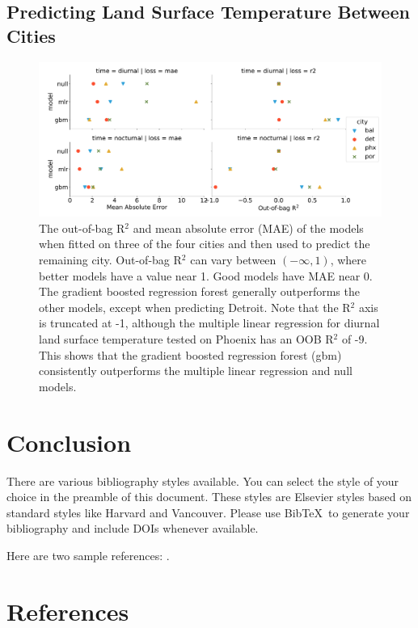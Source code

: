 \documentclass[]{elsarticle}
\begin{document}
\subsection{Predicting Land Surface Temperature Between Cities}

\begin{figure}[h]
\begin{center}
\includegraphics[width=\textwidth]{fig/report/cities_holdout.pdf}
\caption{The out-of-bag R$^2$ and mean absolute error (MAE) of the models when fitted on three of the four cities and then used to predict the remaining city. Out-of-bag R$^2$ can vary between $(-\infty, 1)$, where better models have a value near 1. Good models have MAE near 0. The gradient boosted regression forest generally outperforms the other models, except when predicting Detroit. Note that the R$^2$ axis is truncated at -1, although the multiple linear regression for diurnal land surface temperature tested on Phoenix has an OOB R$^2$ of -9.  This shows that the gradient boosted regression forest (gbm) consistently outperforms the multiple linear regression and null models.}
\label{fig:cityholdout_errors}
\end{center}
\end{figure}


\section{Conclusion}

There are various bibliography styles available. You can select the style of your choice in the preamble of this document. These styles are Elsevier styles based on standard styles like Harvard and Vancouver. Please use Bib\TeX\ to generate your bibliography and include DOIs whenever available.

Here are two sample references: \cite{Feynman1963118,Dirac1953888}.

\section*{References}
\end{document}
